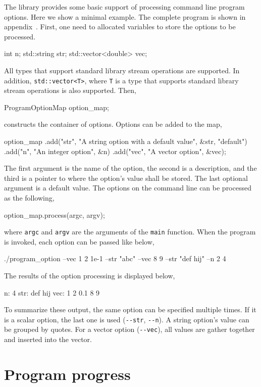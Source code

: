 The library provides some basic support of processing command line program
options. Here we show a minimal example. The complete program is shown in
appendix~. First, one need to allocated
variables to store the options to be processed.
\begin{cppcode}
  int n;
  std::string str;
  std::vector<double> vec;
\end{cppcode}
All types that support standard library \io stream operations are supported. In
addition, \verb|std::vector<T>|, where \verb|T| is a type that supports
standard library \io stream operations is also supported. Then,
\begin{cppcode}
  ProgramOptionMap option_map;
\end{cppcode}
constructs the container of options. Options can be added to the map,
\begin{cppcode}
  option_map
      .add("str", "A string option with a default value", &str, "default")
      .add("n", "An integer option", &n)
      .add("vec", "A vector option", &vec);
\end{cppcode}
The first argument is the name of the option, the second is a description, and
the third is a pointer to where the option's value shall be stored. The last
optional argument is a default value. The options on the command line can be
processed as the following,
\begin{cppcode}
  option_map.process(argc, argv);
\end{cppcode}
where \verb|argc| and \verb|argv| are the arguments of the \verb|main|
function. When the program is invoked, each option can be passed like below,
\begin{textcode}
  ./program_option --vec 1 2 1e-1 --str "abc" --vec 8 9 --str "def hij" --n 2 4
\end{textcode}
The results of the option processing is displayed below,
\begin{textcode}
  n: 4
  str: def hij
  vec: 1 2 0.1 8 9
\end{textcode}
To summarize these output, the same option can be specified multiple times. If
it is a scalar option, the last one is used (\verb|--str|, \verb|--n|). A
string option's value can be grouped by quotes. For a vector option
(\verb|--vec|), all values are gather together and inserted into the vector.

\section{Program progress}
\label{sec:Program progress}

